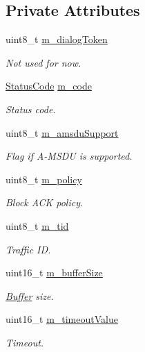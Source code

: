 \subsection*{Private Attributes}
\begin{DoxyCompactItemize}
\item 
uint8\+\_\+t \hyperlink{classns3_1_1MgtAddBaResponseHeader_a3feffddcab1185126c37d833f4d480ce}{m\+\_\+dialog\+Token}
\begin{DoxyCompactList}\small\item\em Not used for now. \end{DoxyCompactList}\item 
\hyperlink{classns3_1_1StatusCode}{Status\+Code} \hyperlink{classns3_1_1MgtAddBaResponseHeader_afcee59678062bc46f5843a725d735e6b}{m\+\_\+code}
\begin{DoxyCompactList}\small\item\em Status code. \end{DoxyCompactList}\item 
uint8\+\_\+t \hyperlink{classns3_1_1MgtAddBaResponseHeader_a11f64936fd91d6ff3ca697f3369ae371}{m\+\_\+amsdu\+Support}
\begin{DoxyCompactList}\small\item\em Flag if A-\/\+M\+S\+DU is supported. \end{DoxyCompactList}\item 
uint8\+\_\+t \hyperlink{classns3_1_1MgtAddBaResponseHeader_a6cb62392943e751be833cbef7dbe9dda}{m\+\_\+policy}
\begin{DoxyCompactList}\small\item\em Block A\+CK policy. \end{DoxyCompactList}\item 
uint8\+\_\+t \hyperlink{classns3_1_1MgtAddBaResponseHeader_ab07814fdd0cab095f482656cbe8b20e6}{m\+\_\+tid}
\begin{DoxyCompactList}\small\item\em Traffic ID. \end{DoxyCompactList}\item 
uint16\+\_\+t \hyperlink{classns3_1_1MgtAddBaResponseHeader_a096db2e879b1b2ea1b4965fdbdeb74ec}{m\+\_\+buffer\+Size}
\begin{DoxyCompactList}\small\item\em \hyperlink{classns3_1_1Buffer}{Buffer} size. \end{DoxyCompactList}\item 
uint16\+\_\+t \hyperlink{classns3_1_1MgtAddBaResponseHeader_a80cf49d04f1ba5fd1f892319ec23c6de}{m\+\_\+timeout\+Value}
\begin{DoxyCompactList}\small\item\em Timeout. \end{DoxyCompactList}\end{DoxyCompactItemize}
